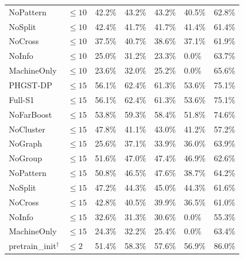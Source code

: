 \begin{table}[p]
\begin{tabularx}{\textwidth}{@{}lXXXXXX@{}}
NoPattern & $\le 10$ & 42.2\% & 43.2\% & 43.2\% & 40.5\% & 62.8\% \\
NoSplit & $\le 10$ & 42.4\% & 41.7\% & 41.7\% & 41.4\% & 61.4\% \\
NoCross & $\le 10$ & 37.5\% & 40.7\% & 38.6\% & 37.1\% & 61.9\% \\
NoInfo & $\le 10$ & 25.0\% & 31.2\% & 23.3\% & 0.0\% & 63.7\% \\
MachineOnly & $\le 10$ & 23.6\% & 32.0\% & 25.2\% & 0.0\% & 65.6\% \\
\midrule
PHGST-DP & $\le 15$ & 56.1\% & 62.4\% & 61.3\% & 53.6\% & 75.1\% \\
Full-S1 & $\le 15$ & 56.1\% & 62.4\% & 61.3\% & 53.6\% & 75.1\% \\
NoFarBoost & $\le 15$ & 53.8\% & 59.3\% & 58.4\% & 51.8\% & 74.6\% \\
NoCluster & $\le 15$ & 47.8\% & 41.1\% & 43.0\% & 41.2\% & 57.2\% \\
NoGraph & $\le 15$ & 25.6\% & 37.1\% & 33.9\% & 36.0\% & 63.9\% \\
NoGroup & $\le 15$ & 51.6\% & 47.0\% & 47.4\% & 46.9\% & 62.6\% \\
NoPattern & $\le 15$ & 50.8\% & 46.5\% & 47.6\% & 38.7\% & 64.2\% \\
NoSplit & $\le 15$ & 47.2\% & 44.3\% & 45.0\% & 44.3\% & 61.6\% \\
NoCross & $\le 15$ & 42.8\% & 40.5\% & 39.9\% & 36.5\% & 61.0\% \\
NoInfo & $\le 15$ & 32.6\% & 31.3\% & 30.6\% & 0.0\% & 55.3\% \\
MachineOnly & $\le 15$ & 24.3\% & 32.2\% & 25.4\% & 0.0\% & 63.4\% \\
\midrule
pretrain\_init$^\dagger$ & $\le 2$ & 51.4\% & 58.3\% & 57.6\% & 56.9\% & 86.0\% \\
\bottomrule
\end{tabularx}
\end{table}

